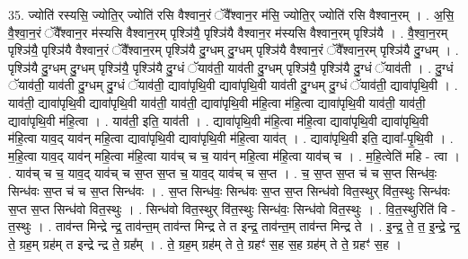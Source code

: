 \documentclass[17pt]{extarticle}
\begin{document}
35. ज्योति॑ रस्यसि॒ ज्योति॒र् ज्योति॑ रसि वैश्वान॒रं ॅवै᳚श्वान॒र म॑सि॒ ज्योति॒र् ज्योति॑ रसि वैश्वान॒रम् । . अ॒सि॒ वै॒श्वा॒न॒रं ॅवै᳚श्वान॒र म॑स्यसि वैश्वान॒रम् पृश्ञि॑यै॒ पृश्ञि॑यै वैश्वान॒र म॑स्यसि वैश्वान॒रम् पृश्ञि॑यै । . वै॒श्वा॒न॒रम् पृश्ञि॑यै॒ पृश्ञि॑यै वैश्वान॒रं ॅवै᳚श्वान॒रम् पृश्ञि॑यै दु॒ग्धम् दु॒ग्धम् पृश्ञि॑यै वैश्वान॒रं ॅवै᳚श्वान॒रम् पृश्ञि॑यै दु॒ग्धम् । . पृश्ञि॑यै दु॒ग्धम् दु॒ग्धम् पृश्ञि॑यै॒ पृश्ञि॑यै दु॒ग्धं ॅयाव॑ती॒ याव॑ती दु॒ग्धम् पृश्ञि॑यै॒ पृश्ञि॑यै दु॒ग्धं ॅयाव॑ती । . दु॒ग्धं ॅयाव॑ती॒ याव॑ती दु॒ग्धम् दु॒ग्धं ॅयाव॑ती॒ द्यावा॑पृथि॒वी द्यावा॑पृथि॒वी याव॑ती दु॒ग्धम् दु॒ग्धं ॅयाव॑ती॒ द्यावा॑पृथि॒वी । . याव॑ती॒ द्यावा॑पृथि॒वी द्यावा॑पृथि॒वी याव॑ती॒ याव॑ती॒ द्यावा॑पृथि॒वी म॑हि॒त्वा म॑हि॒त्वा द्यावा॑पृथि॒वी याव॑ती॒ याव॑ती॒ द्यावा॑पृथि॒वी म॑हि॒त्वा । . याव॑ती॒ इति॒ याव॑ती । . द्यावा॑पृथि॒वी म॑हि॒त्वा म॑हि॒त्वा द्यावा॑पृथि॒वी द्यावा॑पृथि॒वी म॑हि॒त्वा याव॒द् याव॑न् महि॒त्वा द्यावा॑पृथि॒वी द्यावा॑पृथि॒वी म॑हि॒त्वा याव॑त् । . द्यावा॑पृथि॒वी इति॒ द्यावा᳚-पृ॒थि॒वी । . म॒हि॒त्वा याव॒द् याव॑न् महि॒त्वा म॑हि॒त्वा याव॑च् च च॒ याव॑न् महि॒त्वा म॑हि॒त्वा याव॑च् च । . म॒हि॒त्वेति॑ महि - त्वा । . याव॑च् च च॒ याव॒द् याव॑च् च स॒प्त स॒प्त च॒ याव॒द् याव॑च् च स॒प्त । . च॒ स॒प्त स॒प्त च॑ च स॒प्त सिन्ध॑वः॒ सिन्ध॑वः स॒प्त च॑ च स॒प्त सिन्ध॑वः । . स॒प्त सिन्ध॑वः॒ सिन्ध॑वः स॒प्त स॒प्त सिन्ध॑वो वित॒स्थुर् वि॑त॒स्थुः सिन्ध॑वः स॒प्त स॒प्त सिन्ध॑वो वित॒स्थुः । . सिन्ध॑वो वित॒स्थुर् वि॑त॒स्थुः सिन्ध॑वः॒ सिन्ध॑वो वित॒स्थुः । . वि॒त॒स्थुरिति॑ वि - त॒स्थुः । . ताव॑न्त मिन्द्रे न्द्र॒ ताव॑न्त॒म् ताव॑न्त मिन्द्र ते त इन्द्र॒ ताव॑न्त॒म् ताव॑न्त मिन्द्र ते । . इ॒न्द्र॒ ते॒ त॒ इ॒न्द्रे॒ न्द्र॒ ते॒ ग्रह॒म् ग्रह॑म् त इन्द्रे न्द्र ते॒ ग्रह᳚म् । . ते॒ ग्रह॒म् ग्रह॑म् ते ते॒ ग्रहꣳ॑ स॒ह स॒ह ग्रह॑म् ते ते॒ ग्रहꣳ॑ स॒ह । \newline
\pagebreak
{}
\end{document}
